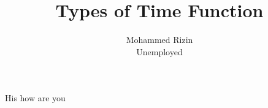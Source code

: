 \documentclass[twocolumn]{article}
\title{Types of Time Function}
\author{Mohammed Rizin \\ Unemployed}
\begin{document}
\maketitle

His how are you
\end{document}
